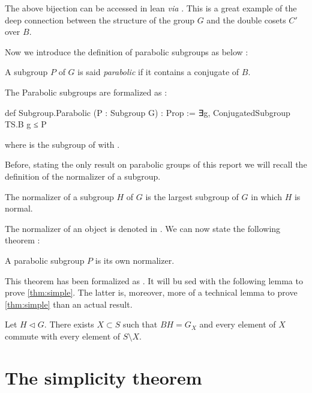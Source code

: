 The above bijection can be accessed in lean \textit{via}  . This is a great example of the deep connection between the structure of the group $G$ and the double cosets $C'$ over $B$.

Now we introduce the definition of parabolic subgroups as below :

\begin{definition}
    A subgroup $P$ of $G$ is said \emph{parabolic} if it contains a conjugate of $B$.
\end{definition}

    The Parabolic subgroups are formalized as :

\begin{leancode}
def Subgroup.Parabolic (P : Subgroup G) : Prop := ∃g, ConjugatedSubgroup TS.B g ≤ P
\end{leancode}
where  is the subgroup of  with .

Before, stating the only result on parabolic groups of this report we will recall the definition of the normalizer of a subgroup.

\begin{definition}
    The normalizer of a subgroup $H$ of $G$ is the largest subgroup of $G$ in which $H$ is normal.
\end{definition}

The normalizer of an object  is denoted  in \Lean. We can now state the following theorem :
\begin{theoreme}\label{thm:parabolic}
    A parabolic subgroup $P$ is its own normalizer.
\end{theoreme}

This theorem has been formalized as  . It will bu sed with the following lemma to prove \ref{thm:simple}. The latter is, moreover, more of a technical lemma to prove \ref{thm:simple} than an actual result.

\begin{lemme} \label{lem:2}
Let $H \triangleleft G$. There exists $X \subset S$ such that $BH = G_X$ and every element of $X$ commute with every element of $S \setminus X$.
\end{lemme}

\section{The simplicity theorem}%
\label{sec:simple}

